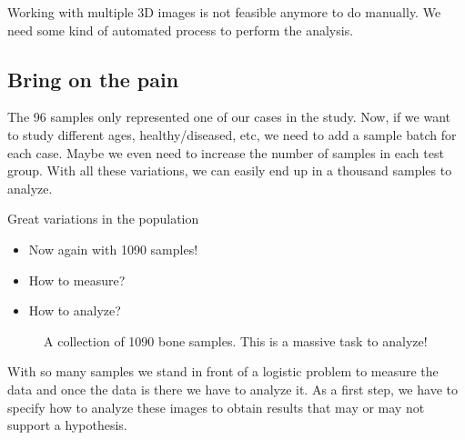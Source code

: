 \documentclass[letterpaper,10pt,english]{sphinxmanual}
\begin{document}
\sphinxAtStartPar
Working with multiple 3D images is not feasible anymore to do manually. We need some kind of automated process to perform the analysis.


\subsection{Bring on the pain}
\label{\detokenize{01-Introduction:bring-on-the-pain}}
\sphinxAtStartPar
The 96 samples only represented one of our cases in the study. Now, if we want to study different ages, healthy/diseased, etc, we need to add a sample batch for each case. Maybe we even need to increase the number of samples in each test group. With all these variations, we can easily end up in a thousand samples to analyze.

\sphinxAtStartPar
Great variations in the population
\begin{itemize}
\item {} 
\sphinxAtStartPar
Now again with 1090 samples!

\item {} 
\sphinxAtStartPar
How to measure?

\item {} 
\sphinxAtStartPar
How to analyze?

\end{itemize}



\begin{figure}[htbp]
\centering
\capstart

\noindent{}
\caption{A collection of 1090 bone samples. This is a massive task to analyze!}\label{\detokenize{01-Introduction:id13}}\end{figure}

\sphinxAtStartPar
With so many samples we stand in front of a logistic problem to measure the data and once the data is there we have to analyze it. As a first step, we have to specify how to analyze these images to obtain results that may or may not support a hypothesis.
\end{document}
